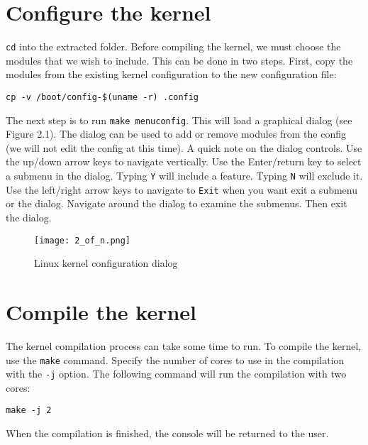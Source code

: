 \documentclass[12pt,a4paper]{report}
\begin{document}
\section{Configure the kernel}
\texttt{cd} into the extracted folder. Before compiling the kernel, we must choose the modules that we wish to include. This can be done in two steps. First, copy the modules from the existing kernel configuration to the new configuration file:
\newline
\newline
\centerline{\texttt{cp -v /boot/config-\$(uname -r) .config}}
\newline
\newline
The next step is to run \texttt{make menuconfig}. This will load a graphical dialog (see Figure 2.1). The dialog can be used to add or remove modules from the config (we will not edit the config at this time).
A quick note on the dialog controls. Use the up/down arrow keys to navigate vertically. Use the Enter/return key to select a submenu in the dialog. Typing \texttt{Y} will include a feature. Typing \texttt{N} will exclude it. Use the left/right arrow keys to navigate to \texttt{Exit} when you want exit a submenu or the dialog.
\newline
\newline
Navigate around the dialog to examine the submenus. Then exit the dialog.

\begin{figure}[t!]
\centerline{\texttt{[image: 2\_of\_n.png]}}
\caption{Linux kernel configuration dialog}
\label{fig}
\end{figure}



\section{Compile the kernel}
The kernel compilation process can take some time to run. To compile the kernel, use the \texttt{make} command. Specify the number of cores to use in the compilation with the \texttt{-j} option. The following command will run the compilation with two cores:
\newline
\newline
\centerline{\texttt{make -j 2}}
\newline
\newline 
When the compilation is finished, the console will be returned to the user.
\end{document}

